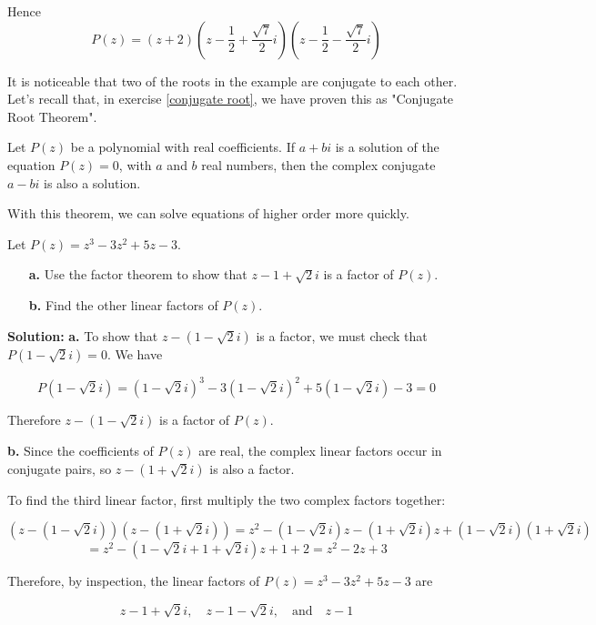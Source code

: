 \documentclass[
	12pt, %
	fleqn, %
	a4paper, %
]{LegrandOrangeBook}
\begin{document}
Hence
\[
P(z) = (z + 2)\left(z - \frac{1}{2} + \frac{\sqrt{7}}{2}i\right)\left(z - \frac{1}{2} - \frac{\sqrt{7}}{2}i\right)
\]

It is noticeable that two of the roots in the example are conjugate to each other. Let's recall that, in
exercise \ref{conjugate root}, we have proven this as "Conjugate Root Theorem".
\begin{theorem}
    Let \( P(z) \) be a polynomial with real coefficients. If \( a + bi \) is a solution of the equation \( P(z) = 0 \), with \( a \) and \( b \) real numbers, then the complex conjugate \( a - bi \) is also a solution.
\end{theorem}

With this theorem, we can solve equations of higher order more quickly.

\begin{example}
    Let \( P(z) = z^3 - 3z^2 + 5z - 3 \).

\begin{enumerate}
    \item[\textbf{a.}] Use the factor theorem to show that \( z - 1 + \sqrt{2}i \) is a factor of \( P(z) \).
    \item[\textbf{b.}] Find the other linear factors of \( P(z) \).
\end{enumerate}
\end{example}
\textbf{Solution:}
\textbf{a.} To show that \( z - (1 - \sqrt{2}i) \) is a factor, we must check that \( P(1 - \sqrt{2}i) = 0 \).
We have

\[ 
P(1 - \sqrt{2}i) = (1 - \sqrt{2}i)^3 - 3(1 - \sqrt{2}i)^2 + 5(1 - \sqrt{2}i) - 3 = 0 
\]

Therefore \( z - (1 - \sqrt{2}i) \) is a factor of \( P(z) \).

\textbf{b.} Since the coefficients of \( P(z) \) are real, the complex linear factors occur in conjugate pairs, so \( z - (1 + \sqrt{2}i) \) is also a factor.

To find the third linear factor, first multiply the two complex factors together:

\[
(z - (1 - \sqrt{2}i))(z - (1 + \sqrt{2}i)) = z^2 - (1 - \sqrt{2}i)z - (1 + \sqrt{2}i)z + (1 - \sqrt{2}i)(1 + \sqrt{2}i)
\]
\[
= z^2 - (1 - \sqrt{2}i + 1 + \sqrt{2}i)z + 1 + 2 = z^2 - 2z + 3
\]

Therefore, by inspection, the linear factors of \( P(z) = z^3 - 3z^2 + 5z - 3 \) are

\[ z - 1 + \sqrt{2}i, \quad z - 1 - \sqrt{2}i, \quad \text{and} \quad z - 1 \]
\end{document}
